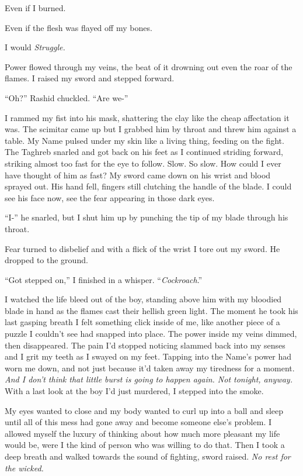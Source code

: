 \documentclass[12pt, openany]{book}
\begin{document}
Even if I burned. 

Even if the flesh was flayed off my bones.

I would \textit{Struggle.}

Power flowed through my veins, the beat of it drowning out even the roar of the flames. I raised my sword and stepped forward.

“Oh?” Rashid chuckled. “Are we-”

I rammed my fist into his mask, shattering the clay like the cheap affectation it was. The scimitar came up but I grabbed him by throat and threw him against a table. My Name pulsed under my skin like a living thing, feeding on the fight. The Taghreb snarled and got back on his feet as I continued striding forward, striking almost too fast for the eye to follow. Slow. So slow. How could I ever have thought of him as fast? My sword came down on his wrist and blood sprayed out. His hand fell, fingers still clutching the handle of the blade. I could see his face now, see the fear appearing in those dark eyes.

“I-” he snarled, but I shut him up by punching the tip of my blade through his throat.

Fear turned to disbelief and with a flick of the wrist I tore out my sword. He dropped to the ground.

“Got stepped on,” I finished in a whisper. “\textit{Cockroach}.”

I watched the life bleed out of the boy, standing above him with my bloodied blade in hand as the flames cast their hellish green light. The moment he took his last gasping breath I felt something click inside of me, like another piece of a puzzle I couldn’t see had snapped into place. The power inside my veins dimmed, then disappeared\textit{.} The pain I’d stopped noticing slammed back into my senses and I grit my teeth as I swayed on my feet\textit{. }Tapping into the Name’s power had worn me down, and not just because it’d taken away my tiredness for a moment. \textit{And I don’t think that little burst is going to happen again. Not tonight, anyway.} With a last look at the boy I’d just murdered, I stepped into the smoke.

My eyes wanted to close and my body wanted to curl up into a ball and sleep until all of this mess had gone away and become someone else’s problem. I allowed myself the luxury of thinking about how much more pleasant my life would be, were I the kind of person who was willing to do that. Then I took a deep breath and walked towards the sound of fighting, sword raised. \textit{No rest for the wicked.}
\end{document}
